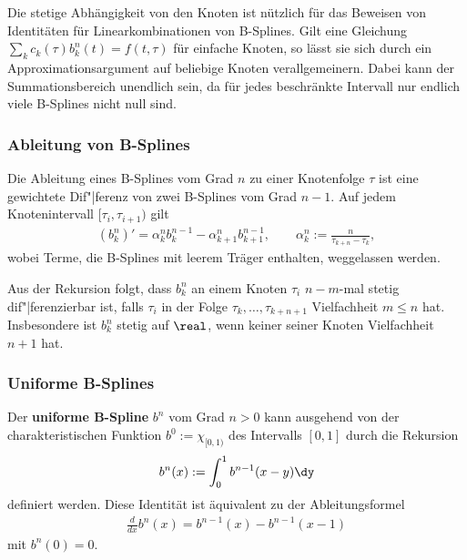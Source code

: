 \linie

Die stetige Abhängigkeit von den Knoten ist nützlich für das Beweisen von
Identitäten für Linearkombinationen von B-Splines.
Gilt eine Gleichung $\sum_k c_k(\tau) b_k^n(t) = f(t, \tau)$
für einfache Knoten, so lässt sie sich durch ein Approximationsargument auf
beliebige Knoten verallgemeinern.
Dabei kann der Summationsbereich unendlich sein, da für jedes beschränkte
Intervall nur endlich viele B-Splines nicht null sind.

\pagebreak

\subsubsection{%
    Ableitung von B-Splines%
}

Die Ableitung eines B-Splines vom Grad $n$ zu einer Knotenfolge $\tau$ ist
eine gewichtete Dif"|ferenz von zwei B-Splines vom Grad $n - 1$.
Auf jedem Knotenintervall $[\tau_i, \tau_{i+1})$ gilt
\begin{align*}
    (b_k^n)' = \alpha_k^n b_k^{n-1} - \alpha_{k+1}^n b_{k+1}^{n-1}, \qquad
    \alpha_k^n := \frac{n}{\tau_{k+n} - \tau_k},
\end{align*}
wobei Terme, die B-Splines mit leerem Träger enthalten, weggelassen werden.

Aus der Rekursion folgt, dass $b_k^n$ an einem Knoten $\tau_i$ $n - m$-mal
stetig dif"|ferenzierbar ist, falls $\tau_i$ in der Folge
$\tau_k, \dotsc, \tau_{k+n+1}$ Vielfachheit $m \le n$ hat.
Insbesondere ist $b_k^n$ stetig auf $\real$, wenn keiner seiner Knoten
Vielfachheit $n + 1$ hat.

\subsubsection{%
    Uniforme B-Splines%
}

Der \textbf{uniforme B-Spline} $b^n$ vom Grad $n > 0$ kann ausgehend von der
charakteristischen Funktion $b^0 := \chi_{[0,1)}$ des Intervalls $[0, 1]$
durch die Rekursion
\begin{align*}
    b^n(x) := \int_0^1 b^{n-1} (x - y) \dy
\end{align*}
definiert werden.
Diese Identität ist äquivalent zu der Ableitungsformel
\begin{align*}
    \frac{d}{dx} b^n(x) = b^{n-1}(x) - b^{n-1}(x - 1)
\end{align*}
mit $b^n(0) = 0$.

\linie

